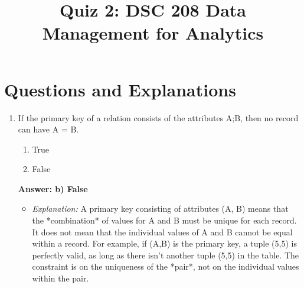 \documentclass{article}
\title{Quiz 2: DSC 208 Data Management for Analytics}
\author{}
\date{}
\begin{document}
\maketitle

\section*{Questions and Explanations}

\begin{enumerate}[label=\textbf{Question \arabic*.}]

\item If the primary key of a relation consists of the attributes A;B, then no record can have A = B.
    \begin{enumerate}[label=\alph*)]
        \item True
        \item False
    \end{enumerate}
    \textbf{Answer: b) False}
    \begin{itemize}
        \item \textit{Explanation:} A primary key consisting of attributes (A, B) means that the *combination* of values for A and B must be unique for each record. It does not mean that the individual values of A and B cannot be equal within a record. For example, if (A,B) is the primary key, a tuple (5,5) is perfectly valid, as long as there isn't another tuple (5,5) in the table. The constraint is on the uniqueness of the *pair*, not on the individual values within the pair.
    \end{itemize}


\end{enumerate}
\end{document}
